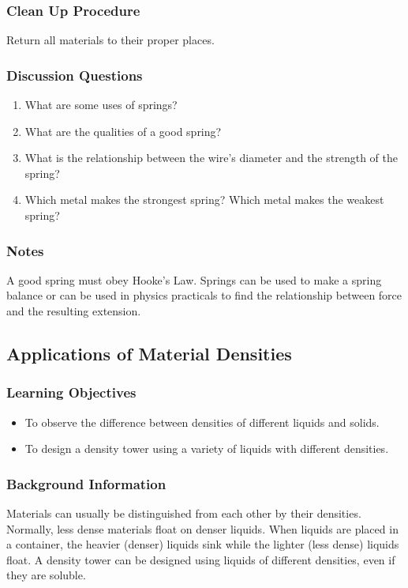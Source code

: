 \subsubsection*{Clean Up Procedure}
Return all materials to their proper places.

\subsubsection*{Discussion Questions}
\begin{enumerate}
\item{What are some uses of springs?}
\item{What are the qualities of a good spring?}
\item{What is the relationship between the wire's diameter and the strength of the spring?}
\item{Which metal makes the strongest spring?  Which metal makes the weakest spring?}
\end{enumerate}

\subsubsection*{Notes}
A good spring must obey Hooke's Law.  Springs can be used to make a spring balance or can be used in physics practicals to find the relationship between force and the resulting extension.




\subsection{Applications of Material Densities}

\subsubsection*{Learning Objectives}
\begin{itemize}
\item{To observe the difference between densities of different liquids and solids.} 
\item{To design a density tower using a variety of liquids with different densities.} 
\end{itemize}

\subsubsection*{Background Information}
Materials can usually be distinguished from each other by their densities.  Normally, less dense materials float on denser liquids.  When liquids are placed in a container, the heavier (denser) liquids sink while the lighter (less dense) liquids float.  A density tower can be designed using liquids of different densities, even if they are soluble.

